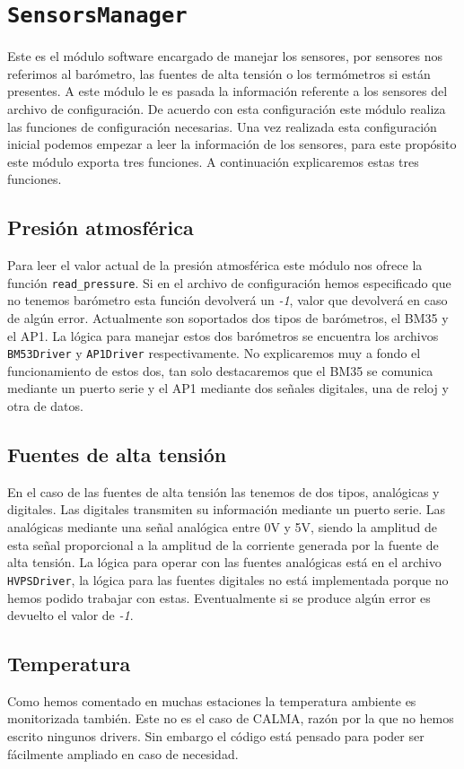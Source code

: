 \section{\texttt{SensorsManager}}
	Este es el módulo software encargado de manejar los sensores, por sensores nos referimos al barómetro, las fuentes de alta tensión o los
	termómetros si están presentes. A este módulo le es pasada la información referente a los sensores del archivo de configuración. De acuerdo
	con esta configuración este módulo realiza las funciones de configuración necesarias. Una vez realizada esta configuración inicial podemos
	empezar a leer la información de los sensores, para este propósito este módulo exporta tres funciones. A continuación explicaremos estas tres
	funciones.
	\subsection{Presión atmosférica}
		Para leer el valor actual de la presión atmosférica este módulo nos ofrece la función \texttt{read\_pressure}. Si en el archivo de
		configuración hemos especificado que no tenemos barómetro esta función devolverá un \emph{-1}, valor que devolverá en caso de algún
		error. Actualmente son soportados dos tipos de barómetros, el BM35\cite{} y el AP1\cite{}. La lógica para manejar estos dos barómetros
		se encuentra los archivos \texttt{BM53Driver} y \texttt{AP1Driver} respectivamente. No explicaremos muy a fondo el funcionamiento de
		estos dos, tan solo destacaremos que el BM35 se comunica mediante un puerto serie y el AP1 mediante dos señales digitales, una de
		reloj y otra de datos.
	\subsection{Fuentes de alta tensión}
		En el caso de las fuentes de alta tensión las tenemos de dos tipos, analógicas y digitales. Las digitales transmiten su información
		mediante un puerto serie. Las analógicas mediante una señal analógica entre 0V y 5V, siendo la amplitud de esta señal proporcional a
		la amplitud de la corriente generada por la fuente de alta tensión. La  lógica para operar con las fuentes analógicas está en el
		archivo \texttt{HVPSDriver}, la lógica para las fuentes digitales no está implementada porque no hemos podido trabajar con estas.
		Eventualmente si se produce algún error es devuelto el valor de \emph{-1}.
	\subsection{Temperatura}
		Como hemos comentado en muchas estaciones la temperatura ambiente es monitorizada también. Este no es el caso de CALMA, razón por la que
		no hemos escrito ningunos drivers. Sin embargo el código está pensado para poder ser fácilmente ampliado en caso de necesidad. 

